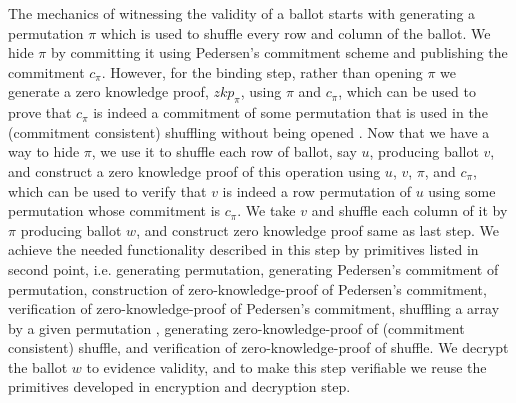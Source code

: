 \documentclass{llncs}
\begin{document}
The mechanics of witnessing the validity of a ballot starts with generating a 
permutation $\pi$ which is used to shuffle every row and column of the ballot.
We hide $\pi$ by committing it using Pedersen's 
commitment scheme 
and publishing  the commitment $c_{\pi}$. However, for the binding step, rather 
than opening $\pi$ we generate a zero knowledge proof, $zkp_{\pi}$, 
using $\pi$ and $c_{\pi}$, which can 
be  used to prove that $c_{\pi}$ is indeed a commitment of some permutation
that is used in the (commitment consistent) shuffling 
 without being opened \cite{Wikstrom:2009:CPS}. Now that we have a way 
 to hide $\pi$, we use it to shuffle each row of 
ballot, say $u$, producing ballot $v$, and construct a zero knowledge proof 
of this operation using $u$, $v$, $\pi$, and $c_{\pi}$, which can be used 
to verify that $v$ is indeed a row permutation of $u$ using some permutation 
whose commitment is $c_{\pi}$. We take $v$ and shuffle each column of it 
by $\pi$ producing ballot $w$, and construct zero knowledge proof same 
as last step. We achieve the needed functionality described in this step
by primitives listed in second point, i.e. 
generating permutation, generating  Pedersen's 
commitment \cite{Pederson} of permutation, construction of 
zero-knowledge-proof of Pedersen's commitment, verification of 
zero-knowledge-proof of Pedersen's commitment, shuffling a array 
by a given permutation \cite{Wikstrom:2009:CPS}, 
generating zero-knowledge-proof of (commitment consistent) shuffle, 
and verification of zero-knowledge-proof of shuffle.
We decrypt the ballot $w$ to evidence validity, and to make this step
 verifiable we reuse the primitives developed in
 encryption and decryption step.
\end{document}

